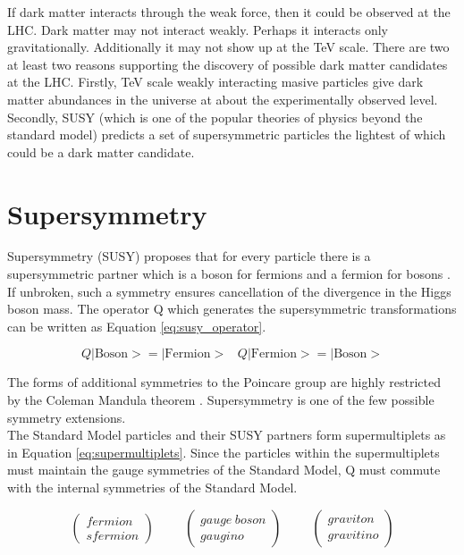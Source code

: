 If dark matter interacts through the weak force, then it could be observed at
the LHC. Dark matter may not interact weakly. Perhaps it interacts only 
gravitationally. Additionally it may not show up at the TeV scale. There are two
at least two reasons supporting the discovery of possible dark matter candidates 
at the LHC. Firstly, TeV scale weakly interacting masive particles give dark 
matter abundances in the universe at about the experimentally observed level. 
Secondly, SUSY (which is one of the popular theories of physics beyond the 
standard model) predicts a set of supersymmetric particles the lightest of which 
could be a dark matter candidate.

\section{Supersymmetry}

Supersymmetry (SUSY) proposes that for every particle there is a supersymmetric 
partner which is a boson for fermions and a fermion for bosons \cite{primer}. 
If unbroken, such a symmetry ensures cancellation of the divergence in the Higgs 
boson mass. The operator Q which generates the supersymmetric transformations 
can be written as Equation \ref{eq:susy_operator}.

\begin{equation}
Q|\mbox{Boson}> = |\mbox{Fermion}> \hspace{10pt} Q|\mbox{Fermion}> = |\mbox{Boson}>
\label{eq:susy_operator}
\end{equation}

The forms of additional symmetries to the Poincare group are highly restricted
by the Coleman Mandula theorem \cite{coleman}. Supersymmetry is one of the few
possible symmetry extensions. \\ 

The Standard Model particles and their SUSY partners form supermultiplets as in
Equation \ref{eq:supermultiplets}. Since the particles within the
supermultiplets must maintain the gauge symmetries of the Standard Model, Q must 
commute with the internal symmetries of the Standard Model.

\begin{equation}
\left(\begin{array}{c}fermion\\sfermion\end{array}\right) \hspace{1cm}
\left(\begin{array}{c}gauge\hspace{3pt}boson\\gaugino\end{array}\right) \hspace{1cm}
\left(\begin{array}{c}graviton\\gravitino\end{array}\right)
\label{eq:supermultiplets}
\end{equation}

